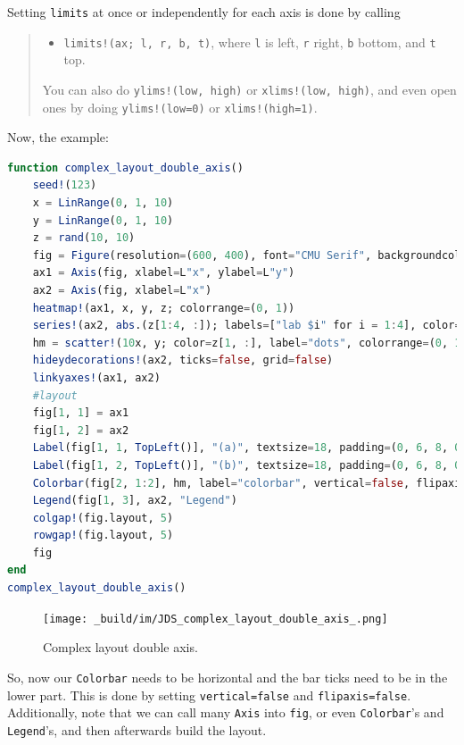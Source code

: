 \documentclass[
  notoc %
]{tufte-book}
\providecommand{\tightlist}{%
  \setlength{\itemsep}{0pt}\setlength{\parskip}{0pt}
}
\newcommand{\passthrough}[1]{#1}
\begin{document}
Setting \passthrough{\lstinline!limits!} at once or independently for
each axis is done by calling

\begin{quote}
\begin{itemize}
\tightlist
\item
  \passthrough{\lstinline"limits!(ax; l, r, b, t)"}, where
  \passthrough{\lstinline!l!} is left, \passthrough{\lstinline!r!}
  right, \passthrough{\lstinline!b!} bottom, and
  \passthrough{\lstinline!t!} top.
\end{itemize}

You can also do \passthrough{\lstinline"ylims!(low, high)"} or
\passthrough{\lstinline"xlims!(low, high)"}, and even open ones by doing
\passthrough{\lstinline"ylims!(low=0)"} or
\passthrough{\lstinline"xlims!(high=1)"}.
\end{quote}

Now, the example:

\begin{lstlisting}[language=Julia]
function complex_layout_double_axis()
    seed!(123)
    x = LinRange(0, 1, 10)
    y = LinRange(0, 1, 10)
    z = rand(10, 10)
    fig = Figure(resolution=(600, 400), font="CMU Serif", backgroundcolor=:grey90)
    ax1 = Axis(fig, xlabel=L"x", ylabel=L"y")
    ax2 = Axis(fig, xlabel=L"x")
    heatmap!(ax1, x, y, z; colorrange=(0, 1))
    series!(ax2, abs.(z[1:4, :]); labels=["lab $i" for i = 1:4], color=:Set1_4)
    hm = scatter!(10x, y; color=z[1, :], label="dots", colorrange=(0, 1))
    hideydecorations!(ax2, ticks=false, grid=false)
    linkyaxes!(ax1, ax2)
    #layout
    fig[1, 1] = ax1
    fig[1, 2] = ax2
    Label(fig[1, 1, TopLeft()], "(a)", textsize=18, padding=(0, 6, 8, 0))
    Label(fig[1, 2, TopLeft()], "(b)", textsize=18, padding=(0, 6, 8, 0))
    Colorbar(fig[2, 1:2], hm, label="colorbar", vertical=false, flipaxis=false)
    Legend(fig[1, 3], ax2, "Legend")
    colgap!(fig.layout, 5)
    rowgap!(fig.layout, 5)
    fig
end
complex_layout_double_axis()
\end{lstlisting}

\begin{figure}
\hypertarget{fig:complex_layout_double_axis}{%
\centering
\texttt{[image: \_build/im/JDS\_complex\_layout\_double\_axis\_.png]}
\caption{Complex layout double
axis.}\label{fig:complex_layout_double_axis}
}
\end{figure}

So, now our \passthrough{\lstinline!Colorbar!} needs to be horizontal
and the bar ticks need to be in the lower part. This is done by setting
\passthrough{\lstinline!vertical=false!} and
\passthrough{\lstinline!flipaxis=false!}. Additionally, note that we can
call many \passthrough{\lstinline!Axis!} into
\passthrough{\lstinline!fig!}, or even
\passthrough{\lstinline!Colorbar!}'s and
\passthrough{\lstinline!Legend!}'s, and then afterwards build the
layout.
\end{document}
